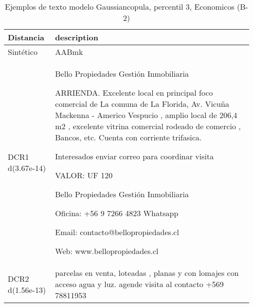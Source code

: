 \begin{table}[H]
\centering
\fontsize{10}{14}\selectfont
\caption{Ejemplos de texto modelo Gaussiancopula, percentil 3, Economicos (B-2)}
\label{table-example-economicos-b-2-gaussiancopula-3p-text}
\begin{tabular}{|l|m{35em}|}
\hline
\rowcolor[gray]{0.8}
Distancia & description \\
\hline Sintético & AABmk \\
\hline DCR1 d(3.67e-14) &  Bello Propiedades Gesti\'on Inmobiliaria

 
ARRIENDA. Excelente local en principal foco comercial de La comuna de La Florida, Av. Vicu\~na Mackenna - Americo Vespucio , amplio local de 206,4 m2 , excelente vitrina comercial rodeado de comercio ,  Bancos,  etc.  Cuenta con corriente trifasica.
 
Interesados enviar correo para coordinar visita 
 
 VALOR: UF  120
 
Bello Propiedades Gesti\'on Inmobiliaria
 
 Oficina: +56 9 7266 4823 Whatsapp
 
Email: contacto@bellopropiedades.cl
 
Web: www.bellopropiedades.cl \\
\hline DCR2 d(1.56e-13) & parcelas en venta, loteadas , planas y con lomajes con acceso agua y luz.  agende visita al contacto +569 78811953 \\
\hline
\end{tabular}
\end{table}
